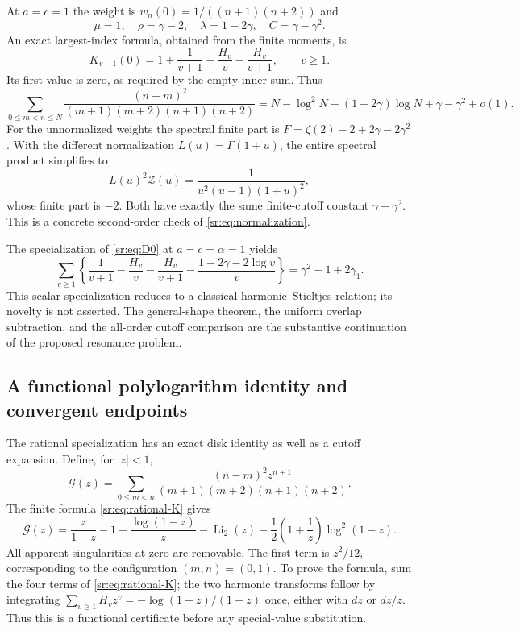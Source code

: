 \documentclass[11pt,letterpaper]{article}
\theoremstyle{definition}
\theoremstyle{remark}
\numberwithin{equation}{section}
\begin{document}
At $a=c=1$ the weight is $w_n(0)=1/((n+1)(n+2))$ and
\[
 \mu=1,\quad \rho=\gamma-2,\quad \lambda=1-2\gamma,
 \quad C=\gamma-\gamma^2.
\]
An exact largest-index formula, obtained from the finite moments, is
\begin{equation}\label{sr:eq:rational-K}
 K_{v-1}(0)=1+\frac1{v+1}-\frac{H_v}{v}-\frac{H_v}{v+1},
 \qquad v\ge1.
\end{equation}
Its first value is zero, as required by the empty inner sum. Thus
\begin{equation}\label{sr:eq:integer-cutoff}
 \sum_{0\le m<n\le N}\frac{(n-m)^2}{(m+1)(m+2)(n+1)(n+2)}
 =N-\log^2N+(1-2\gamma)\log N+\gamma-\gamma^2+o(1).
\end{equation}
For the unnormalized weights the spectral finite part is
$F=\zeta(2)-2+2\gamma-2\gamma^2$. With the different normalization
$L(u)=\Gamma(1+u)$, the entire spectral product simplifies to
\[
 L(u)^2\mathcal Z(u)=\frac1{u^2(u-1)(1+u)^2},
\]
whose finite part is $-2$. Both have exactly the same finite-cutoff
constant $\gamma-\gamma^2$. This is a concrete second-order check
of \eqref{sr:eq:normalization}.

The specialization of \eqref{sr:eq:D0} at $a=c=\alpha=1$ yields
\[
 \sum_{v\ge1}\left\{
 \frac1{v+1}-\frac{H_v}{v}-\frac{H_v}{v+1}
 -\frac{1-2\gamma-2\log v}{v}\right\}
 =\gamma^2-1+2\gamma_1.
\]
This scalar specialization reduces to a classical harmonic--Stieltjes
relation; its novelty is not asserted. The general-shape theorem, the
uniform overlap subtraction, and the all-order cutoff comparison are
the substantive continuation of the proposed resonance problem.

\subsection{A functional polylogarithm identity and convergent endpoints}
The rational specialization has an exact disk identity as well as a
cutoff expansion. Define, for $|z|<1$,
\[
 \mathcal G(z)=\sum_{0\le m<n}
 \frac{(n-m)^2z^{n+1}}{(m+1)(m+2)(n+1)(n+2)}.
\]
The finite formula \eqref{sr:eq:rational-K} gives
\begin{equation}\label{sr:eq:G-polylog}
 \boxed{\displaystyle
 \mathcal G(z)=\frac z{1-z}-1-\frac{\log(1-z)}z
 -\operatorname{Li}_2(z)-\frac12\left(1+\frac1z\right)\log^2(1-z).}
\end{equation}
All apparent singularities at zero are removable. The first term is
$z^2/12$, corresponding to the configuration $(m,n)=(0,1)$.
To prove the formula, sum the four terms of
\eqref{sr:eq:rational-K}; the two harmonic transforms follow by
integrating $\sum_{v\ge1}H_vz^v=-\log(1-z)/(1-z)$ once, either with
$dz$ or $dz/z$. Thus this is a functional certificate before any
special-value substitution.
\end{document}
